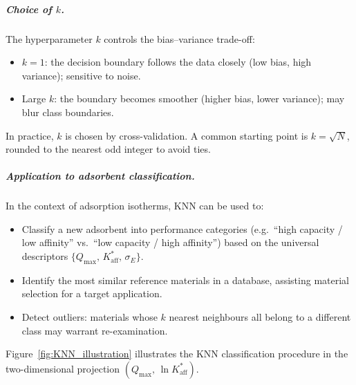 	\subparagraph{Choice of $k$.}
	The hyperparameter $k$ controls the bias--variance trade-off:
	\begin{itemize}
		\item $k = 1$: the decision boundary follows the data
		closely (low bias, high variance); sensitive to noise.
		\item Large $k$: the boundary becomes smoother (higher bias,
		lower variance); may blur class boundaries.
	\end{itemize}
	In practice, $k$ is chosen by cross-validation. A common
	starting point is $k = \sqrt{N}$, rounded to the nearest odd
	integer to avoid ties.

	\subparagraph{Application to adsorbent classification.}
	In the context of adsorption isotherms, KNN can be used to:
	\begin{itemize}
		\item Classify a new adsorbent into performance categories
		(e.g.\ ``high capacity / low affinity'' vs.\ ``low capacity
		/ high affinity'') based on the universal descriptors
		$\{Q_{\max},\, K_{\mathrm{aff}}^{\ast},\, \sigma_E\}$.
		\item Identify the most similar reference materials in a
		database, assisting material selection for a target
		application.
		\item Detect outliers: materials whose $k$ nearest neighbours
		all belong to a different class may warrant re-examination.
	\end{itemize}

	Figure~\ref{fig:KNN_illustration} illustrates the KNN
	classification procedure in the two-dimensional projection
	$(Q_{\max},\, \ln K_{\mathrm{aff}}^{\ast})$.

